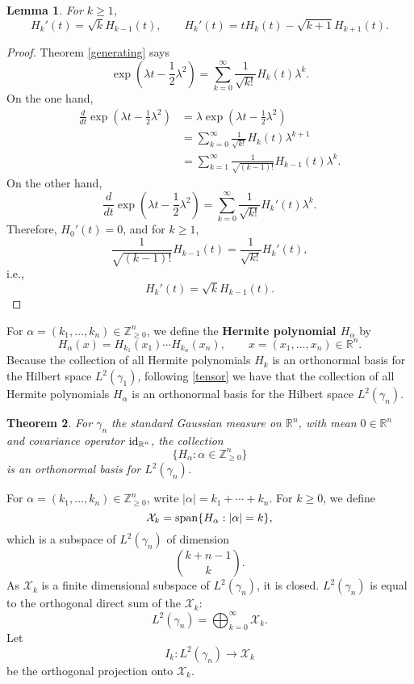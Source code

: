 \documentclass{article}
\newcommand{\Span}{\ensuremath\mathrm{span}}
\newcommand{\id}{\ensuremath\mathrm{id}}
\newtheorem{theorem}{Theorem}
\newtheorem{lemma}[theorem]{Lemma}
\theoremstyle{definition}
\begin{document}
\begin{lemma}
For $k \geq 1$,
\[
H_k'(t) = \sqrt{k} H_{k-1}(t), \qquad H_k'(t)= tH_k(t) - \sqrt{k+1} H_{k+1}(t).
\]
\end{lemma}
\begin{proof}
Theorem \ref{generating} says
\[
\exp\left(\lambda t-\frac{1}{2}\lambda^2\right) = \sum_{k=0}^\infty  \frac{1}{\sqrt{k!}} H_k(t) \lambda^k.
\]
On the one hand,
\begin{align*}
\frac{d}{dt} \exp\left(\lambda t-\frac{1}{2}\lambda^2\right) &= \lambda \exp\left(\lambda t-\frac{1}{2}\lambda^2\right)\\
&=\sum_{k=0}^\infty  \frac{1}{\sqrt{k!}} H_k(t) \lambda^{k+1}\\
&=\sum_{k=1}^\infty \frac{1}{\sqrt{(k-1)!}} H_{k-1}(t) \lambda^k.
\end{align*}
On the other hand,
\[
\frac{d}{dt} \exp\left(\lambda t-\frac{1}{2}\lambda^2\right)  = \sum_{k=0}^\infty \frac{1}{\sqrt{k!}} H_k'(t) \lambda^k.
\]
Therefore,  $H_0'(t)=0$, and for $k \geq 1$,
\[
\frac{1}{\sqrt{(k-1)!}} H_{k-1}(t) =  \frac{1}{\sqrt{k!}} H_k'(t),
\]
i.e.,
\[
H_k'(t) = \sqrt{k} H_{k-1}(t).
\]
\end{proof}

For $\alpha=(k_1,\ldots,k_n) \in \mathbb{Z}_{\geq 0}^n$, we define the \textbf{Hermite polynomial $H_\alpha$} by
\[
H_\alpha(x) = H_{k_1}(x_1) \cdots H_{k_n}(x_n), \qquad x = (x_1,\ldots,x_n) \in \mathbb{R}^n.
\]
Because the collection of all Hermite polynomials $H_k$ is an orthonormal basis for the Hilbert space $L^2(\gamma_1)$, following
\eqref{tensor} we have that the collection of all Hermite polynomials $H_\alpha$ is an orthonormal basis for the Hilbert
space $L^2(\gamma_n)$. 

\begin{theorem}
For $\gamma_n$ the standard Gaussian measure on $\mathbb{R}^n$, with mean $0 \in \mathbb{R}^n$ and covariance operator
$\id_{\mathbb{R}^n}$,
the collection
\[
\{H_\alpha: \alpha \in \mathbb{Z}_{\geq 0}^n\}
\]
is an orthonormal basis for $L^2(\gamma_n)$.
\end{theorem}

For $\alpha=(k_1,\ldots,k_n) \in \mathbb{Z}_{\geq 0}^n$, write $|\alpha|=k_1+\cdots+k_n$. 
For $k \geq 0$, we define
\[
\mathcal{X}_k = \Span\{H_\alpha: |\alpha|=k\},
\]
which is a subspace of $L^2(\gamma_n)$ of dimension
\[
\binom{k+n-1}{k}.
\]
As $\mathcal{X}_k$ 
is a finite dimensional subspace of $L^2(\gamma_n)$, it is closed. 
$L^2(\gamma_n)$ is equal to the orthogonal direct sum of the $\mathcal{X}_k$:
\[
L^2(\gamma_n) = \bigoplus_{k=0}^\infty \mathcal{X}_k.
\]
Let 
\[
I_k:L^2(\gamma_n) \to \mathcal{X}_k
\]
 be the  orthogonal projection onto $\mathcal{X}_k$. 
\end{document}
